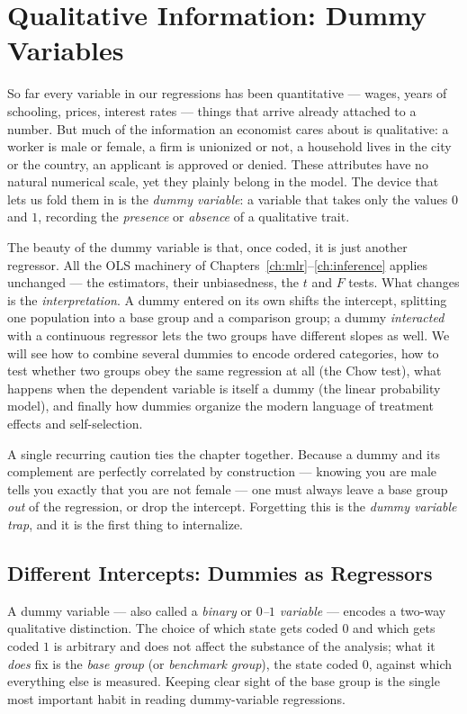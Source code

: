 \chapter{Qualitative Information: Dummy Variables}
\label{ch:dummies}

So far every variable in our regressions has been quantitative --- wages, years of schooling, prices, interest rates --- things that arrive already attached to a number. But much of the information an economist cares about is qualitative: a worker is male or female, a firm is unionized or not, a household lives in the city or the country, an applicant is approved or denied. These attributes have no natural numerical scale, yet they plainly belong in the model. The device that lets us fold them in is the \emph{dummy variable}: a variable that takes only the values $0$ and $1$, recording the \emph{presence} or \emph{absence} of a qualitative trait.

The beauty of the dummy variable is that, once coded, it is just another regressor. All the OLS machinery of Chapters~\ref{ch:mlr}--\ref{ch:inference} applies unchanged --- the estimators, their unbiasedness, the $t$ and $F$ tests. What changes is the \emph{interpretation}. A dummy entered on its own shifts the intercept, splitting one population into a base group and a comparison group; a dummy \emph{interacted} with a continuous regressor lets the two groups have different slopes as well. We will see how to combine several dummies to encode ordered categories, how to test whether two groups obey the same regression at all (the Chow test), what happens when the dependent variable is itself a dummy (the linear probability model), and finally how dummies organize the modern language of treatment effects and self-selection.

A single recurring caution ties the chapter together. Because a dummy and its complement are perfectly correlated by construction --- knowing you are male tells you exactly that you are not female --- one must always leave a base group \emph{out} of the regression, or drop the intercept. Forgetting this is the \emph{dummy variable trap}, and it is the first thing to internalize.

\section{Different Intercepts: Dummies as Regressors}

A dummy variable --- also called a \emph{binary} or \emph{$0$--$1$ variable} --- encodes a two-way qualitative distinction. The choice of which state gets coded $0$ and which gets coded $1$ is arbitrary and does not affect the substance of the analysis; what it \emph{does} fix is the \emph{base group} (or \emph{benchmark group}), the state coded $0$, against which everything else is measured. Keeping clear sight of the base group is the single most important habit in reading dummy-variable regressions.

